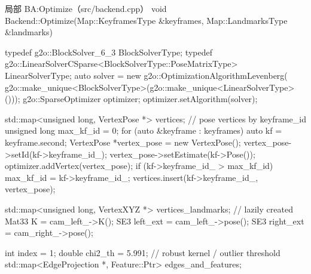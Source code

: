 \begin{codebox}[C++]{局部 BA:Optimize（src/backend.cpp）}
void Backend::Optimize(Map::KeyframesType &keyframes, Map::LandmarksType &landmarks) {
    typedef g2o::BlockSolver_6_3 BlockSolverType;
    typedef g2o::LinearSolverCSparse<BlockSolverType::PoseMatrixType> LinearSolverType;
    auto solver = new g2o::OptimizationAlgorithmLevenberg(
        g2o::make_unique<BlockSolverType>(g2o::make_unique<LinearSolverType>()));
    g2o::SparseOptimizer optimizer;
    optimizer.setAlgorithm(solver);

    std::map<unsigned long, VertexPose *> vertices;       // pose vertices by keyframe_id
    unsigned long max_kf_id = 0;
    for (auto &keyframe : keyframes) {
        auto kf = keyframe.second;
        VertexPose *vertex_pose = new VertexPose();
        vertex_pose->setId(kf->keyframe_id_);
        vertex_pose->setEstimate(kf->Pose());
        optimizer.addVertex(vertex_pose);
        if (kf->keyframe_id_ > max_kf_id) max_kf_id = kf->keyframe_id_;
        vertices.insert({kf->keyframe_id_, vertex_pose});
    }

    std::map<unsigned long, VertexXYZ *> vertices_landmarks;  // lazily created
    Mat33 K = cam_left_->K();
    SE3 left_ext = cam_left_->pose();
    SE3 right_ext = cam_right_->pose();

    int index = 1;
    double chi2_th = 5.991;                        // robust kernel / outlier threshold
    std::map<EdgeProjection *, Feature::Ptr> edges_and_features;

}
\end{codebox}
